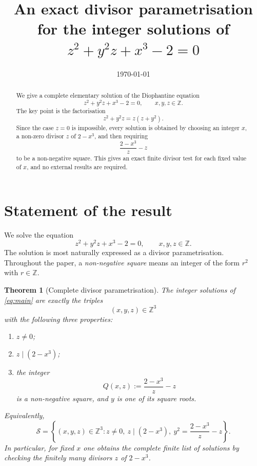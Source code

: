 \documentclass[11pt,a4paper]{amsart}
\title[The equation $z^2+y^2z+x^3-2=0$]{An exact divisor parametrisation for the integer solutions of $z^2+y^2z+x^3-2=0$}
\author{}
\date{\today}
\newtheorem{theorem}{Theorem}
\theoremstyle{definition}
\newcommand{\Z}{\mathbb Z}
\begin{document}
\begin{abstract}
We give a complete elementary solution of the Diophantine equation
\[
        z^2+y^2z+x^3-2=0,
        \qquad x,y,z\in \Z.
\]
The key point is the factorisation
\[
        z^2+y^2z=z(z+y^2).
\]
Since the case $z=0$ is impossible, every solution is obtained by choosing an integer $x$, a non-zero divisor $z$ of $2-x^3$, and then requiring
\[
        \frac{2-x^3}{z}-z
\]
to be a non-negative square. This gives an exact finite divisor test for each fixed value of $x$, and no external results are required.
\end{abstract}

\maketitle

\section{Statement of the result}

We solve the equation
\begin{equation}\label{eq:main}
        z^2+y^2z+x^3-2=0,
        \qquad x,y,z\in \Z.
\end{equation}
The solution is most naturally expressed as a divisor parametrisation. Throughout the paper, a \emph{non-negative square} means an integer of the form $r^2$ with $r\in\Z$.

\begin{theorem}[Complete divisor parametrisation]\label{thm:main}
The integer solutions of \eqref{eq:main} are exactly the triples
\begin{equation}\label{eq:param_set}
        (x,y,z)\in \Z^3
\end{equation}
with the following three properties:
\begin{enumerate}[label=\textup{(\roman*)}]
    \item $z\ne 0$;
    \item $z\mid (2-x^3)$;
    \item the integer
    \[
            Q(x,z):=\frac{2-x^3}{z}-z
    \]
    is a non-negative square, and $y$ is one of its square roots.
\end{enumerate}
Equivalently,
\begin{equation}\label{eq:solution_set}
\boxed{
\mathcal S
=
\left\{(x,y,z)\in\Z^3:
        z\ne0,
        \ z\mid(2-x^3),
        \ y^2=\frac{2-x^3}{z}-z
\right\}.}
\end{equation}
In particular, for fixed $x$ one obtains the complete finite list of solutions by checking the finitely many divisors $z$ of $2-x^3$.
\end{theorem}
\end{document}
